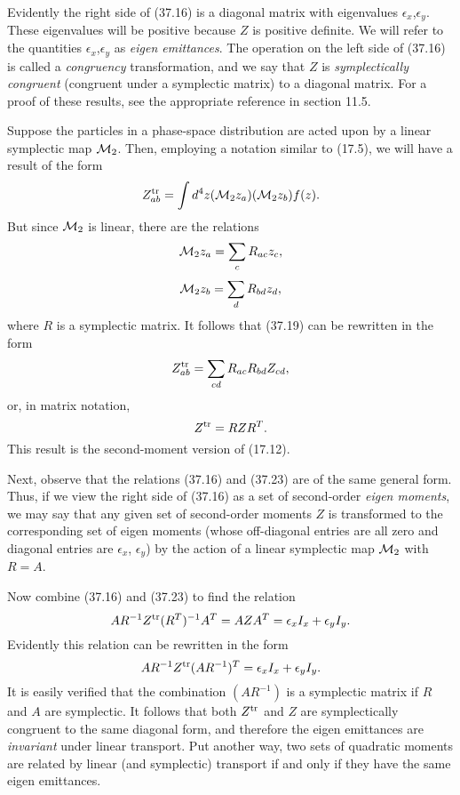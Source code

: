 Evidently the right side of (37.16) is a diagonal matrix with eigenvalues $\epsilon_x$,$\epsilon_y$.  These eigenvalues will be positive because $Z$ is positive definite.  We will refer to the quantities $\epsilon_x$,$\epsilon_y$ as {\em eigen emittances}.  The operation on the left side of (37.16) is called a {\em congruency} transformation, and we say that $Z$ is {\em symplectically congruent} (congruent under a symplectic matrix) to a diagonal matrix.  For a proof of these results, see the appropriate reference in section 11.5.   

Suppose the particles in a phase-space distribution are acted upon by a linear symplectic map ${\cal M}_2$.  Then, employing a notation similar to (17.5), we will have a result of the form
\begin{equation}
Z^{\rm tr}_{ab} = \int d^4z ({\cal M}_2 z_a)({\cal M}_2 z_b) f(z) .
\end{equation}
But since ${\cal M}_2$ is linear, there are the relations
\begin{equation}
{\cal M}_2 z_a = \sum_c R_{ac} z_c,
\end{equation}
\begin{equation}
{\cal M}_2 z_b = \sum_d R_{bd} z_d,
\end{equation}
where $R$ is a symplectic matrix.  It follows that (37.19) can be rewritten in the form
\begin{equation}
Z^{\rm tr}_{ab} = \sum_{cd} R_{ac} R_{bd} Z_{cd},
\end{equation}
or, in matrix notation,
\begin{equation}
Z^{\rm tr} = RZR^T.
\end{equation}
This result is the second-moment version of (17.12).

Next, observe that the relations (37.16) and (37.23) are of the same general form.  Thus, if we view the right side of (37.16) as a set of second-order {\em eigen moments}, we may say that any given set of second-order moments $Z$ is transformed to the corresponding set of eigen moments (whose off-diagonal entries are all zero and diagonal entries are $\epsilon_x$, $\epsilon_y$) by the action of a linear symplectic map ${\cal M}_2$ with $R=A$.

Now combine (37.16) and (37.23) to find the relation
\begin{equation}
AR^{-1}Z^{\rm tr}(R^T)^{-1}A^T = AZA^T = \epsilon_x I_x + \epsilon_y I_y.
\end{equation}
Evidently this relation can be rewritten in the form
\begin{equation}
AR^{-1} Z^{\rm tr} (AR^{-1})^T = \epsilon_xI_x + \epsilon_yI_y.
\end{equation}
It is easily verified that the combination $(AR^{-1})$ is a symplectic matrix if $R$ and $A$ are symplectic.  It follows that both $Z^{\rm tr}$ and $Z$ are symplectically congruent to the same diagonal form, and therefore the eigen emittances are {\em invariant} under linear transport.  Put another way, two sets of quadratic moments are related by linear (and symplectic) transport if and only if they have the same eigen emittances.

